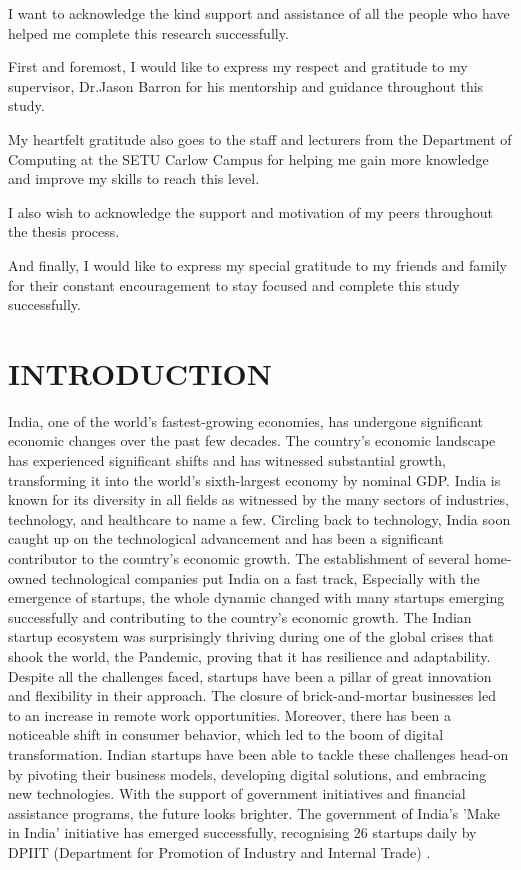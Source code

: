 \documentclass[12pt]{article}
\begin{document}
I want to acknowledge the kind support and assistance of all the people who have helped me complete this research successfully. 

First and foremost, I would like to express my respect and gratitude to my supervisor, Dr.Jason Barron for his mentorship and guidance throughout this study.

My heartfelt gratitude also goes to the staff and lecturers from the Department of Computing at the SETU Carlow Campus for helping me gain more knowledge and improve my skills to reach this level. 

I also wish to acknowledge the support and motivation of my peers throughout the thesis process.

And finally, I would like to express my special gratitude to my friends and family for their constant encouragement to stay focused and complete this study successfully.

\newpage
\begingroup %
\color{black}%
\hypersetup{linkcolor=black}
\tableofcontents
\endgroup 

\newpage
\hypersetup{linkcolor = black}
\listoffigures


\newpage

\section{INTRODUCTION}
India, one of the world's fastest-growing economies, has undergone significant economic changes over the past few decades. The country's economic landscape has experienced significant shifts and has witnessed substantial growth, transforming it into the world's sixth-largest economy by nominal GDP. India is known for its diversity in all fields as witnessed by the many sectors of industries, technology, and healthcare to name a few. Circling back to technology, India soon caught up on the technological advancement and has been a significant contributor to the country’s economic growth. The establishment of several home-owned technological companies put India on a fast track, Especially with the emergence of startups, the whole dynamic changed with many startups emerging successfully and contributing to the country’s economic growth.
The Indian startup ecosystem was surprisingly thriving during one of the global crises that shook the world, the Pandemic, proving that it has resilience and adaptability. Despite all the challenges faced, startups have been a pillar of great innovation and flexibility in their approach. The closure of brick-and-mortar businesses led to an increase in remote work opportunities. Moreover, there has been a noticeable shift in consumer behavior, which led to the boom of digital transformation. Indian startups have been able to tackle these challenges head-on by pivoting their business models, developing digital solutions, and embracing new technologies. With the support of government initiatives and financial assistance programs, the future looks brighter. The government of India's 'Make in India' initiative has emerged successfully, recognising 26 startups daily by DPIIT (Department for Promotion of Industry and Internal Trade) \citep{singh2020analyzing}.
\end{document}
